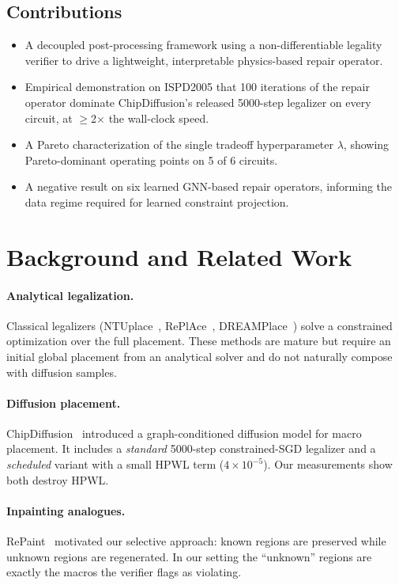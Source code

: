 \documentclass[10pt,twocolumn]{article}
\begin{document}
\subsection{Contributions}
\begin{itemize}
\item A decoupled post-processing framework using a non-differentiable legality verifier to drive a lightweight, interpretable physics-based repair operator.
\item Empirical demonstration on ISPD2005 that 100 iterations of the repair operator dominate ChipDiffusion's released 5000-step legalizer on every circuit, at $\geq$2$\times$ the wall-clock speed.
\item A Pareto characterization of the single tradeoff hyperparameter $\lambda$, showing Pareto-dominant operating points on 5 of 6 circuits.
\item A negative result on six learned GNN-based repair operators, informing the data regime required for learned constraint projection.
\end{itemize}

\section{Background and Related Work}

\paragraph{Analytical legalization.} Classical legalizers (NTUplace~\cite{ntuplace}, RePlAce~\cite{replace}, DREAMPlace~\cite{dreamplace}) solve a constrained optimization over the full placement. These methods are mature but require an initial global placement from an analytical solver and do not naturally compose with diffusion samples.

\paragraph{Diffusion placement.} ChipDiffusion~\cite{chipdiffusion} introduced a graph-conditioned diffusion model for macro placement. It includes a \emph{standard} 5000-step constrained-SGD legalizer and a \emph{scheduled} variant with a small HPWL term ($4\times 10^{-5}$). Our measurements show both destroy HPWL.

\paragraph{Inpainting analogues.} RePaint~\cite{repaint} motivated our selective approach: known regions are preserved while unknown regions are regenerated. In our setting the ``unknown'' regions are exactly the macros the verifier flags as violating.
\end{document}
